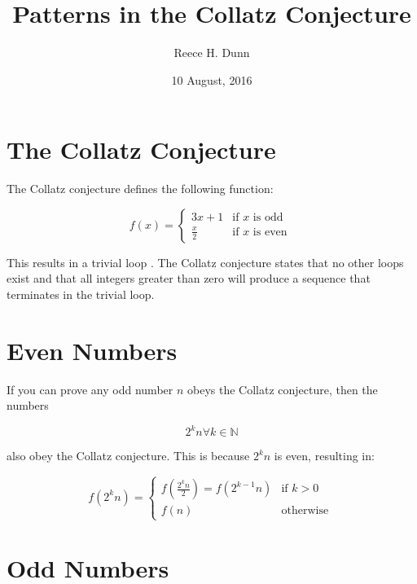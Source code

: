 \documentclass{article}
\title{Patterns in the Collatz Conjecture}
\date{10 August, 2016}
\author{Reece H. Dunn}
\begin{document}
\maketitle

\section{The Collatz Conjecture}

The Collatz conjecture defines the following function:

\begin{displaymath}
f(x) = \begin{cases}
  3x+1        &\text{if } x \text{ is odd} \\
  \frac{x}{2} &\text{if } x \text{ is even} \
\end{cases}
\end{displaymath}

\noindent
This results in a trivial loop \begin{math}[1, 4, 2]\end{math}. The
Collatz conjecture states that no other loops exist and that all
integers greater than zero will produce a sequence that terminates
in the trivial loop.

\section{Even Numbers}

If you can prove any odd number \begin{math}n\end{math} obeys the
Collatz conjecture, then the numbers

\begin{displaymath}
2^{k}n \forall k \in \mathbb{N}
\end{displaymath}

\noindent
also obey the Collatz conjecture. This is because \begin{math}2^{k}n\end{math}
is even, resulting in:

\begin{displaymath}
f(2^{k}n) = \begin{cases}
  f(\frac{2^{k}n}{2}) = f(2^{k-1}n) &\text{if } k>0 \\
  f(n)                              &\text{otherwise} \
\end{cases}
\end{displaymath}

\section{Odd Numbers}
\end{document}
